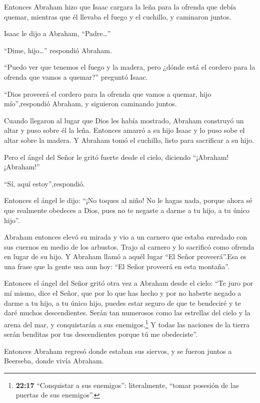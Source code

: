  Entonces Abraham hizo que Isaac cargara la leña para la
ofrenda que debía quemar, mientras que él llevaba el fuego y el
cuchillo, y caminaron juntos.

 Isaac le dijo a Abraham, ``Padre\ldots{}''

``Dime, hijo\ldots{}'' respondió Abraham.

``Puedo ver que tenemos el fuego y la madera, pero ¿dónde está el
cordero para la ofrenda que vamos a quemar?'' preguntó Isaac.

 ``Dios proveerá el cordero para la ofrenda que vamos a
quemar, hijo mío'',respondió Abraham, y siguieron caminando juntos.

 Cuando llegaron al lugar que Dios les había mostrado,
Abraham construyó un altar y puso sobre él la leña. Entonces amarró a su
hijo Isaac y lo puso sobe el altar sobre la madera.  Y
Abraham tomó el cuchillo, listo para sacrificar a su hijo.

 Pero el ángel del Señor le gritó fuerte desde el cielo,
diciendo ``¡Abraham! ¡Abraham!''

``Sí, aquí estoy'',respondió.

 Entonces el ángel le dijo: ``¡No toques al niño! No le
hagas nada, porque ahora sé que realmente obedeces a Dios, pues no te
negaste a darme a tu hijo, a tu único hijo''.

 Abraham entonces elevó su mirada y vio a un carnero que
estaba enredado con sus cuernos en medio de los arbustos. Trajo al
carnero y lo sacrificó como ofrenda en lugar de su hijo.  Y
Abraham llamó a aquél lugar ``El Señor proveerá''.Esa es una frase que
la gente usa aun hoy: ``El Señor proveerá en esta montaña''.

 Entonces el ángel del Señor gritó otra vez a Abraham desde
el cielo:  ``Te juro por mí mismo, dice el Señor, que por
lo que has hecho y por no haberte negado a darme a tu hijo, a tu único
hijo,  puedes estar seguro de que te bendeciré y te daré
muchos descendientes. Serán tan numerosos como las estrellas del cielo y
la arena del mar, y conquistarán a sus enemigos.\footnote{\textbf{22:17}
  ``Conquistar a sus enemigos'': literalmente, ``tomar posesión de las
  puertas de sus enemigos''.}  Y todas las naciones de la
tierra serán benditas por tus descendientes porque tú me obedeciste''.

 Entonces Abraham regresó donde estaban sus siervos, y se
fueron juntos a Beerseba, donde vivía Abraham.

